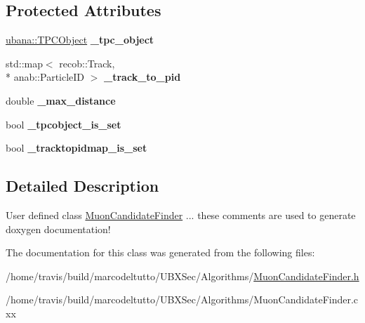 \subsection*{Protected Attributes}
\begin{DoxyCompactItemize}
\item 
\hypertarget{classubana_1_1MuonCandidateFinder_aa10954b71c8b977bf08e8a71f1423318}{\hyperlink{classubana_1_1TPCObject}{ubana\-::\-T\-P\-C\-Object} {\bfseries \-\_\-tpc\-\_\-object}}\label{classubana_1_1MuonCandidateFinder_aa10954b71c8b977bf08e8a71f1423318}

\item 
\hypertarget{classubana_1_1MuonCandidateFinder_ae033ae1668a0dfd8daf2218a8d8b5ff6}{std\-::map$<$ recob\-::\-Track, \\*
anab\-::\-Particle\-I\-D $>$ {\bfseries \-\_\-track\-\_\-to\-\_\-pid}}\label{classubana_1_1MuonCandidateFinder_ae033ae1668a0dfd8daf2218a8d8b5ff6}

\item 
\hypertarget{classubana_1_1MuonCandidateFinder_a94b438c321cb362b6a54814c056e389f}{double {\bfseries \-\_\-max\-\_\-distance}}\label{classubana_1_1MuonCandidateFinder_a94b438c321cb362b6a54814c056e389f}

\item 
\hypertarget{classubana_1_1MuonCandidateFinder_a02badb1ac25eb1095a7f78afb5e36e1b}{bool {\bfseries \-\_\-tpcobject\-\_\-is\-\_\-set}}\label{classubana_1_1MuonCandidateFinder_a02badb1ac25eb1095a7f78afb5e36e1b}

\item 
\hypertarget{classubana_1_1MuonCandidateFinder_a46cb4b649e6d2d9b2e6c7641a9fd548a}{bool {\bfseries \-\_\-tracktopidmap\-\_\-is\-\_\-set}}\label{classubana_1_1MuonCandidateFinder_a46cb4b649e6d2d9b2e6c7641a9fd548a}

\end{DoxyCompactItemize}


\subsection{Detailed Description}
User defined class \hyperlink{classubana_1_1MuonCandidateFinder}{Muon\-Candidate\-Finder} ... these comments are used to generate doxygen documentation! 

The documentation for this class was generated from the following files\-:\begin{DoxyCompactItemize}
\item 
/home/travis/build/marcodeltutto/\-U\-B\-X\-Sec/\-Algorithms/\hyperlink{MuonCandidateFinder_8h}{Muon\-Candidate\-Finder.\-h}\item 
/home/travis/build/marcodeltutto/\-U\-B\-X\-Sec/\-Algorithms/Muon\-Candidate\-Finder.\-cxx\end{DoxyCompactItemize}
